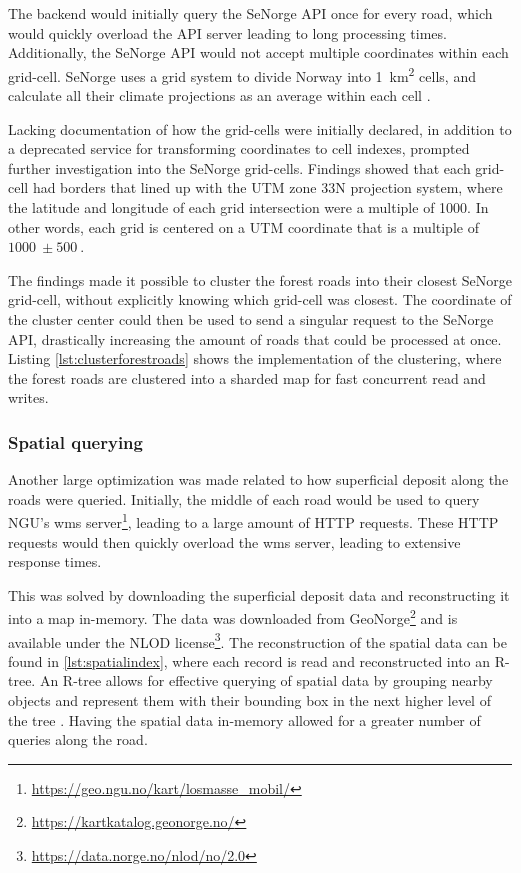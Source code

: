The backend would initially query the SeNorge API once for every road, which would quickly overload the API server leading to long processing times. Additionally, the SeNorge API would not accept multiple coordinates within each grid-cell. SeNorge uses a grid system to divide Norway into \qty{1}{\kilo\meter\squared} cells, and calculate all their climate projections as an average within each cell \cite{senorge_watermap}. 

Lacking documentation of how the grid-cells were initially declared, in addition to a deprecated service for transforming coordinates to cell indexes, prompted further investigation into the SeNorge grid-cells. Findings showed that each grid-cell had borders that lined up with the UTM zone 33N projection system, where the latitude and longitude of each grid intersection were a multiple of \qty{1000}{}. In other words, each grid is centered on a UTM coordinate that is a multiple of $\qty{1000}{}\pm\qty{500}{}$.

The findings made it possible to cluster the forest roads into their closest SeNorge grid-cell, without explicitly knowing which grid-cell was closest. The coordinate of the cluster center could then be used to send a singular request to the SeNorge API, drastically increasing the amount of roads that could be processed at once. Listing \ref{lst:clusterforestroads} shows the implementation of the clustering, where the forest roads are clustered into a sharded map for fast concurrent read and writes.

\begin{figure}[h]

\end{figure}

\subsubsection{Spatial querying}

Another large optimization was made related to how superficial deposit along the roads were queried. Initially, the middle of each road would be used to query NGU's \Gls{wms} server\footnote{\url{https://geo.ngu.no/kart/losmasse_mobil/}}, leading to a large amount of HTTP requests. These HTTP requests would then quickly overload the \Gls{wms} server, leading to extensive response times.

This was solved by downloading the superficial deposit data and reconstructing it into a map in-memory. The data was downloaded from GeoNorge\footnote{\url{https://kartkatalog.geonorge.no/}} and is available under the NLOD license\footnote{\url{https://data.norge.no/nlod/no/2.0}}. The reconstruction of the spatial data can be found in \autoref{lst:spatialindex}, where each record is read and reconstructed into an R-tree. An R-tree allows for effective querying of spatial data by grouping nearby objects and represent them with their bounding box in the next higher level of the tree \cite{rtreewikipedia}. Having the spatial data in-memory allowed for a greater number of queries along the road.

